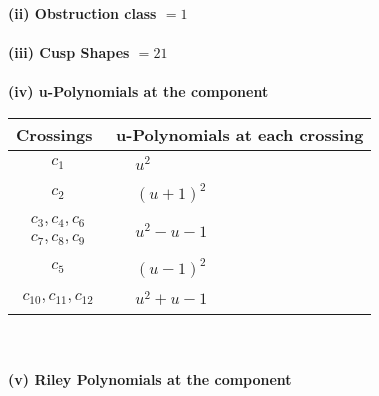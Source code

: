 \documentclass[1p]{elsarticle_modified}
\theoremstyle{definition}
\begin{document}
\flushleft \textbf{(ii) Obstruction class $= 1$}\\~\\
\flushleft \textbf{(iii) Cusp Shapes $= 21$}\\~\\
\newpage\renewcommand{\arraystretch}{1}
\flushleft \textbf{(iv) u-Polynomials at the component}\newline \\
\begin{tabular}{m{50pt}|m{274pt}}
Crossings & \hspace{64pt}u-Polynomials at each crossing \\
\hline $$\begin{aligned}c_{1}\end{aligned}$$&$\begin{aligned}
&u^2
\end{aligned}$\\
\hline $$\begin{aligned}c_{2}\end{aligned}$$&$\begin{aligned}
&(u+1)^2
\end{aligned}$\\
\hline $$\begin{aligned}c_{3},c_{4},c_{6}\\c_{7},c_{8},c_{9}\end{aligned}$$&$\begin{aligned}
&u^2- u-1
\end{aligned}$\\
\hline $$\begin{aligned}c_{5}\end{aligned}$$&$\begin{aligned}
&(u-1)^2
\end{aligned}$\\
\hline $$\begin{aligned}c_{10},c_{11},c_{12}\end{aligned}$$&$\begin{aligned}
&u^2+u-1
\end{aligned}$\\
\hline
\end{tabular}\\~\\
\newpage\renewcommand{\arraystretch}{1}
\flushleft \textbf{(v) Riley Polynomials at the component}\newline \\
\end{document}
